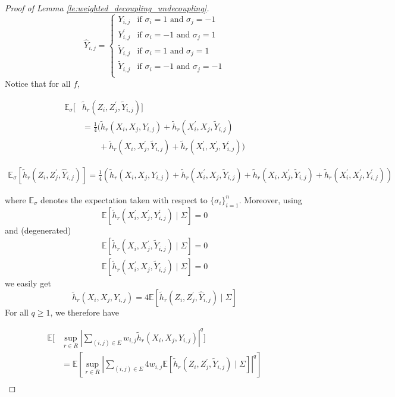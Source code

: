 \documentclass[letterpaper]{article} %
\def\DoubleColumn{}
\def\DoubleColumnEnd{}
\def\SingleColumn{}
\def\SingleColumnEnd{}
\newcommand{\E}{\mathbb{E}}
\newcommand{\pair}[1]{(#1)}
\begin{document}
\begin{proof}[Proof of Lemma \ref{le:weighted_decoupling_undecoupling}]
    \begin{equation*}
        \hat{Y}_{i,j}=\begin{cases}
            Y_{i,j}&\text{if } \sigma_i=1\text{ and } \sigma_j=-1\\
            Y_{i,j}^\prime&\text{if } \sigma_i=-1\text{ and } \sigma_j=1\\
            \tilde{Y}_{i,j}&\text{if } \sigma_i=1\text{ and } \sigma_j=1\\
            \tilde{Y}_{i,j}&\text{if } \sigma_i=-1\text{ and } \sigma_j=-1\\
        \end{cases}
    \end{equation*}
    Notice that for all $f$,
    \DoubleColumn
    \begin{align*}
        \E_\sigma[&\tilde{h}_r(Z_i,Z_j^\prime,\tilde{Y}_{i,j})]\\
        &=\frac{1}{4}(\tilde{h}_r(X_i,X_j, Y_{i,j})+\tilde{h}_r(X_i^\prime,X_j,\tilde{Y}_{i,j})\\
        &\qquad+\tilde{h}_r(X_i,X_j^\prime,\tilde{Y}_{i,j})+\tilde{h}_r(X_i^\prime,X_j^\prime,Y_{i,j}^\prime))    
    \end{align*}
    \DoubleColumnEnd
    \SingleColumn
    \begin{align*}
        \E_\sigma[\tilde{h}_r(Z_i,Z_j^\prime,\hat{Y}_{i,j})]=\frac{1}{4}(\tilde{h}_r(X_i,X_j, Y_{i,j})+\tilde{h}_r(X_i^\prime,X_j,\tilde{Y}_{i,j})+\tilde{h}_r(X_i,X_j^\prime,\tilde{Y}_{i,j})+\tilde{h}_r(X_i^\prime,X_j^\prime,Y_{i,j}^\prime))    
    \end{align*}
    \SingleColumnEnd
    where $\E_\sigma$ denotes the expectation taken with respect to $\{\sigma_i\}_{i=1}^n$. Moreover, using
    \[\E[\tilde{h}_r(X_i^\prime,X_j^\prime,Y_{i,j}^\prime)\mid \Sigma]=0\]
    and (degenerated)
    \begin{align*}
        \E[\tilde{h}_r(X_i,X_j^\prime,\tilde{Y}_{i,j})\mid \Sigma] = 0\\
         \E[\tilde{h}_r(X_i^\prime,X_j,\tilde{Y}_{i,j})\mid \Sigma] = 0
    \end{align*}
    we easily get
    \[\tilde{h}_r(X_i,X_j,Y_{i,j})=4\E[\tilde{h}_r(Z_i,Z_j^\prime,\hat{Y}_{i,j})\mid \Sigma]\]
    For all $q\ge 1$, we therefore have
    \DoubleColumn
    \begin{align*}
        \E[&\sup_{r\in R}|\sum_{\pair{i,j}\in E}w_{i,j}\tilde{h}_r(X_i,X_j,Y_{i,j})|^q]\\
        &=\E[\sup_{r\in R}|\sum_{\pair{i,j}\in E}4w_{i,j}\E[\tilde{h}_r(Z_i,Z_j^\prime,\tilde{Y}_{i,j})\mid\Sigma]|^q]\\

\end{align*}
\end{proof}
\end{document}
